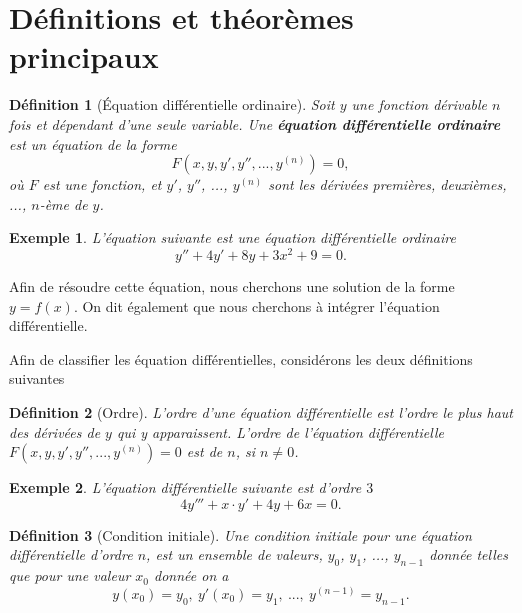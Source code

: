 \documentclass[a4paper,12pt]{book}
\newtheorem{definition}{Définition}
\newtheorem*{exemple}{Exemple}
\begin{document}
\section{Définitions et théorèmes principaux}

\begin{definition}[Équation différentielle ordinaire]
Soit $y$ une fonction dérivable $n$ fois et dépendant d'une seule variable. Une \textbf{équation différentielle ordinaire} est un équation de la forme 
\begin{equation}
 F(x,y,y',y'',...,y^{(n)})=0,
\end{equation}
où $F$ est une fonction, et $y'$, $y''$, ..., $y^{(n)}$ sont les dérivées premières, deuxièmes, ..., $n$-ème de $y$. 
\end{definition}
\begin{exemple}
L'équation suivante est une équation différentielle ordinaire
\begin{equation}
 y''+4y'+8y+3x^2+9=0.
\end{equation}
\end{exemple}

Afin de résoudre cette équation, nous cherchons une solution de la forme $y=f(x)$.
On dit également que nous cherchons à intégrer l'équation différentielle.

Afin de classifier les équation différentielles, considérons les deux définitions suivantes
\begin{definition}[Ordre]
 L'ordre d'une équation différentielle est l'ordre le plus haut des dérivées de $y$ qui y apparaissent.
 L'ordre de l'équation différentielle $F(x,y,y',y'',...,y^{(n)})=0$ est de $n$, si $n\neq 0$.
\end{definition}

\begin{exemple}
L'équation différentielle suivante est d'ordre $3$
\begin{equation}
4y'''+x\cdot y'+4y+6x=0.
\end{equation}
\end{exemple} 


\begin{definition}[Condition initiale]
 Une condition initiale pour une équation différentielle d'ordre $n$, est un ensemble de valeurs, $y_0$, $y_1$, ..., $y_{n-1}$
 donnée telles que pour une valeur $x_0$ donnée on a
 \begin{equation}
  y(x_0)=y_0,\ y'(x_0)=y_1,\ ...,\ y^{(n-1)}=y_{n-1}.
 \end{equation}
\end{definition}
\end{document}
